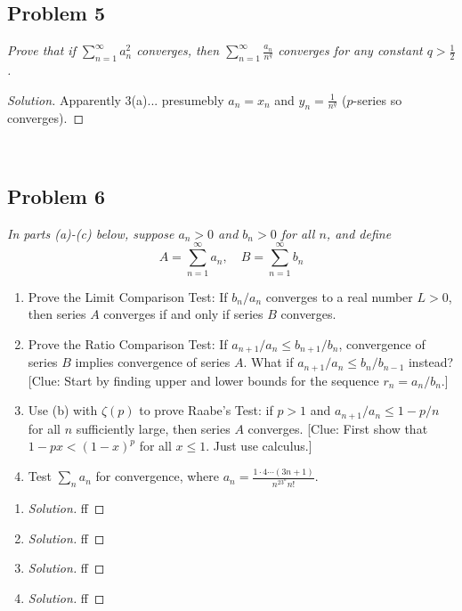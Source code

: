 \documentclass{article}
\begin{document}
\subsection*{Problem 5}
{\it Prove that if $\sum^\infty_{n=1}a^2_n$ converges,
then $\sum_{n=1}^\infty \frac{a_n}{n^q}$
converges for any constant $q > \frac{1}{2}$.}

\begin{proof}[Solution]\let\qed\relax
	Apparently 3(a)... presumebly $a_n = x_n$
	and $y_n = \frac{1}{n^q}$ ($p$-series so converges).
\end{proof} 
\clearpage
~\clearpage

\subsection*{Problem 6}
{\it In parts (a)-(c) below, suppose $a_n > 0$ and $b_n > 0$ for all $n$, and define
\[
	A = \sum_{n=1}^\infty a_n, \quad B = \sum_{n=1}^\infty b_n
\]
\begin{enumerate}
	\item Prove the Limit Comparison Test:
		If $b_n/a_n$ converges to a real number $L > 0$,
		then series $A$ converges if and only if series $B$ converges.
	\item Prove the Ratio Comparison Test:
		If $a_{n+1}/a_n \leq b_{n+1}/b_n$, convergence of series $B$
		implies convergence of series $A$.
		What if $a_{n+1}/a_n \leq b_n/b_{n-1}$ instead?
		[Clue: Start by finding upper and lower bounds for the sequence $r_n = a_n/b_n$.]
	\item Use (b) with $\zeta(p)$ to prove Raabe's Test:
		if $p > 1$ and $a_{n+1}/a_n \leq 1 - p/n$ for all $n$ sufficiently large,
		then series $A$ converges.
		[Clue: First show that $1-px < (1-x)^p$ for all $x \leq 1$. Just use calculus.]
	\item Test $\sum_n a_n$ for convergence,
		where $a_n = \frac{1\cdot 4 \cdots (3n+1)}{n^23^nn!}$.
\end{enumerate}

\begin{enumerate}
	\item \begin{proof}[Solution]\let\qed\relax
		ff
	\end{proof}
	\item \begin{proof}[Solution]\let\qed\relax
		ff
	\end{proof}
	\item \begin{proof}[Solution]\let\qed\relax
		ff
	\end{proof}
	\item \begin{proof}[Solution]\let\qed\relax
		ff
	\end{proof}
\end{enumerate}
\clearpage

}
\end{document}

